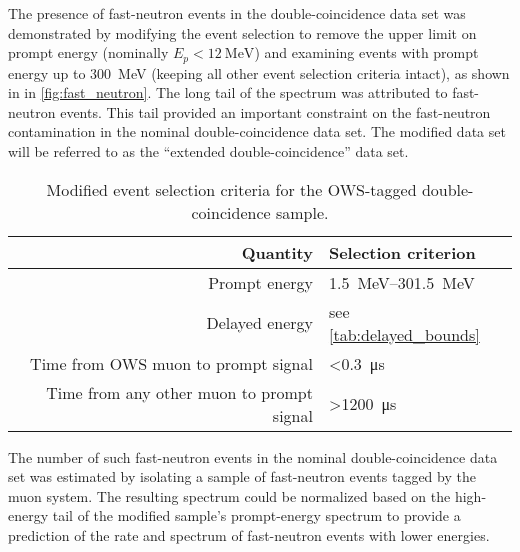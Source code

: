 The presence of fast-neutron events in the double-coincidence data set
was demonstrated by modifying the event selection
to remove the upper limit on prompt energy (nominally $E_p < \SI{12}{\MeV}$)
and examining events with prompt energy up to \SI{300}{\MeV}
(keeping all other event selection criteria intact),
as shown in in \cref{fig:fast_neutron}.
The long tail of the spectrum was attributed to fast-neutron events.
This tail provided an important constraint on the fast-neutron contamination
in the nominal double-coincidence data set.
The modified data set will be referred to as the
``extended double-coincidence'' data set.

\begin{table}[ht]
    \centering
    \caption[OWS tag criteria]{
        Modified event selection criteria for the OWS-tagged
        double-coincidence sample.
    }
    \label{tab:fast_neutron}
    \begin{tabular}[t]{rl}
        \toprule
        Quantity & Selection criterion \\
        \midrule
        Prompt energy & \SIrange{1.5}{301.5}{\MeV} \\
        Delayed energy & see \cref{tab:delayed_bounds} \\
        Time from OWS muon to prompt signal & \SI{<0.3}{\us} \\
        Time from any other muon to prompt signal & \SI{>1200}{\us} \\
        \bottomrule
    \end{tabular}
\end{table}


The number of such fast-neutron events in the nominal double-coincidence data set
was estimated by isolating a sample of fast-neutron events
tagged by the muon system.
The resulting spectrum could be normalized based on the high-energy tail
of the modified sample's prompt-energy spectrum
to provide a prediction of the rate and spectrum of fast-neutron events
with lower energies.

